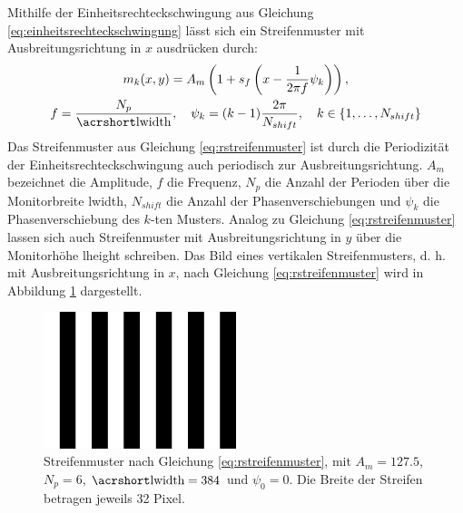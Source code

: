 \noindent
Mithilfe der Einheitsrechteckschwingung aus Gleichung \ref{eq:einheitsrechteckschwingung} lässt sich ein Streifenmuster mit Ausbreitungsrichtung in $x$ ausdrücken durch:
\begin{equation} \label{eq:rstreifenmuster}
	\begin{gathered}
		m_k(x,y) = A_m 
		\left(
			1 + s_f \left(x - \dfrac{1}{2\pi f} \psi_k \right)
		\right),\\
		f = \dfrac{N_p}{\acrshortmath{lwidth}},
		\quad
		\psi_k = (k - 1)\dfrac{2\pi}{N_{shift}},
		\quad
		k \in \lbrace 1,\ldots,N_{shift}\rbrace 
	\end{gathered}
\end{equation}
%
Das Streifenmuster aus Gleichung \ref{eq:rstreifenmuster} ist durch die Periodizität der Einheitsrechteckschwingung auch periodisch zur Ausbreitungsrichtung.
$A_m$ bezeichnet die Amplitude, $f$ die Frequenz, $N_p$ die Anzahl der Perioden über die Monitorbreite \acrshort{lwidth}, $N_{shift}$ die Anzahl der Phasenverschiebungen und $\psi_k$ die Phasenverschiebung des $k$-ten Musters.
Analog zu Gleichung \ref{eq:rstreifenmuster} lassen sich auch Streifenmuster mit Ausbreitungsrichtung in $y$ über die Monitorhöhe \acrshort{lheight} schreiben.
Das Bild eines vertikalen Streifenmusters, d. h. mit Ausbreitungsrichtung in $x$, nach Gleichung \ref{eq:rstreifenmuster} wird in Abbildung \ref{img:rechteckStreifenmuster} dargestellt.
%
\begin{figure}[H]
	\centering
	\includegraphics[frame,width=0.5\textwidth]{03_sichtpruefungDurchLichtstreuung/einsatzVonMehrerenStreifenmustern/figures/rechteckStreifenmuster}
	\caption[Rechteckförmiges Streifenmuster]{Streifenmuster nach Gleichung \ref{eq:rstreifenmuster}, mit $A_m = 127.5$, $N_p = 6$, $\acrshortmath{lwidth} = 384$ und $\psi_0 = 0$. Die Breite der Streifen betragen jeweils 32 Pixel.}
	\label{img:rechteckStreifenmuster}
\end{figure}

